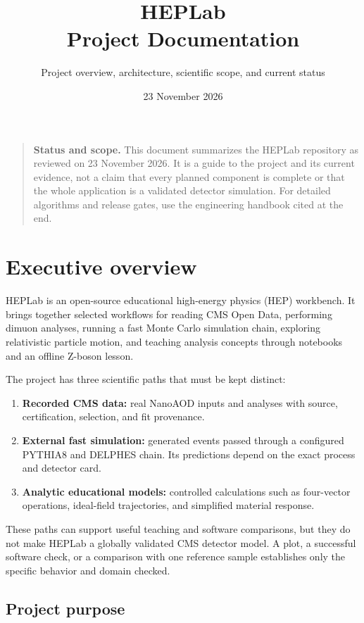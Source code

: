 \documentclass[11pt,a4paper]{article}
\title{\textbf{HEPLab}\\[4pt]\large Project Documentation}
\author{Project overview, architecture, scientific scope, and current status}
\date{23 November 2026}
\begin{document}
\maketitle

\begin{quote}
\textbf{Status and scope.} This document summarizes the HEPLab repository as
reviewed on 23 November 2026. It is a guide to the project and its current
evidence, not a claim that every planned component is complete or that the
whole application is a validated detector simulation. For detailed algorithms
and release gates, use the engineering handbook cited at the end.
\end{quote}

\tableofcontents
\clearpage

\section{Executive overview}

HEPLab is an open-source educational high-energy physics (HEP) workbench. It
brings together selected workflows for reading CMS Open Data, performing
dimuon analyses, running a fast Monte Carlo simulation chain, exploring
relativistic particle motion, and teaching analysis concepts through notebooks
and an offline Z-boson lesson.

The project has three scientific paths that must be kept distinct:

\begin{enumerate}
  \item \textbf{Recorded CMS data:} real NanoAOD inputs and analyses with
  source, certification, selection, and fit provenance.
  \item \textbf{External fast simulation:} generated events passed through a
  configured PYTHIA8 and DELPHES chain. Its predictions depend on the exact
  process and detector card.
  \item \textbf{Analytic educational models:} controlled calculations such as
  four-vector operations, ideal-field trajectories, and simplified material
  response.
\end{enumerate}

These paths can support useful teaching and software comparisons, but they do
not make HEPLab a globally validated CMS detector model. A plot, a successful
software check, or a comparison with one reference sample establishes only the
specific behavior and domain checked.

\subsection{Project purpose}
\end{document}
